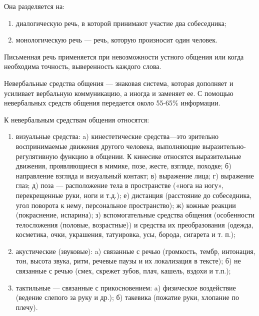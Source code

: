 Она разделяется на:
\begin{enumerate}
	\item диалогическую речь, в которой принимают участие два собеседника;
	\item монологическую речь — речь, которую произносит один человек.
\end{enumerate}

Письменная речь применяется при невозможности устного общения или когда необходима точность, выверенность каждого слова.

Невербальные средства общения — знаковая система, которая дополняет и усиливает вербальную коммуникацию, а иногда и заменяет ее. С помощью невербальных средств общения передается около 55-65\% информации.

К невербальным средствам общения относятся:
\begin{enumerate}
	\item визуальные средства:
		\subitem a) кинестетические средства—это зрительно воспринимаемые движения другого человека, выполняющие выразительно-регулятивную функцию в общении. К кинесике относятся выразительные движения, проявляющиеся в мимике, позе, жесте, взгляде, походке;
		\subitem б) направление взгляда и визуальный контакт;
		\subitem в) выражение лица;
		\subitem г) выражение глаз;
		\subitem д) поза — расположение тела в пространстве («нога на ногу», перекрещенные руки, ноги и т.д.);
		\subitem е) дистанция (расстояние до собеседника, угол поворота к нему, персональное пространство);
		\subitem ж) кожные реакции (покраснение, испарина);
		\subitem з) вспомогательные средства общения (особенности телосложения (половые, возрастные)) и средства их преобразования (одежда, косметика, очки, украшения, татуировка, усы, борода, сигарета и т. п.);
	\item акустические (звуковые):
		\subitem a) связанные с речью (громкость, тембр, интонация, тон, высота звука, ритм, речевые паузы и их локализация в тексте);
		\subitem б) не связанные с речью (смех, скрежет зубов, плач, кашель, вздохи и т.п.);
	\item тактильные — связанные с прикосновением:
		\subitem a) физическое воздействие (ведение слепого за руку и др.);
		\subitem б) такевика (пожатие руки, хлопание по плечу). 
\end{enumerate}
